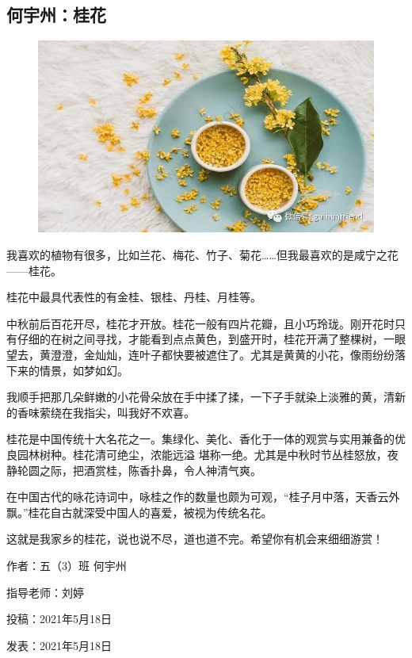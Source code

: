 \vspace{10pt}

{\centering\subsection*{何宇州：桂花}}


\renewcommand{\leftmark}{何宇州：桂花}

\begin{figure}[htbp]

\centering

\includegraphics[width = .5\textwidth]{./ch/22.jpg}

\end{figure}



我喜欢的植物有很多，比如兰花、梅花、竹子、菊花……但我最喜欢的是咸宁之花——桂花。

桂花中最具代表性的有金桂、银桂、丹桂、月桂等。

中秋前后百花开尽，桂花才开放。桂花一般有四片花瓣，且小巧玲珑。刚开花时只有仔细的在树之间寻找，才能看到点点黄色，到盛开时，桂花开满了整棵树，一眼望去，黄澄澄，金灿灿，连叶子都快要被遮住了。尤其是黄黄的小花，像雨纷纷落下来的情景，如梦如幻。

我顺手把那几朵鲜嫩的小花骨朵放在手中揉了揉，一下子手就染上淡雅的黄，清新的香味萦绕在我指尖，叫我好不欢喜。

桂花是中国传统十大名花之一。集绿化、美化、香化于一体的观赏与实用兼备的优良园林树种。桂花清可绝尘，浓能远溢 堪称一绝。尤其是中秋时节丛桂怒放，夜静轮圆之际，把酒赏桂，陈香扑鼻，令人神清气爽。



在中国古代的咏花诗词中，咏桂之作的数量也颇为可观，“桂子月中落，天香云外飘。”桂花自古就深受中国人的喜爱，被视为传统名花。

这就是我家乡的桂花，说也说不尽，道也道不完。希望你有机会来细细游赏！





\vspace{10pt}



作者：五（3）班 何宇州



指导老师：刘婷



投稿：2021年5月18日



发表：2021年5月18日






                



\vspace{10pt}

\hline



